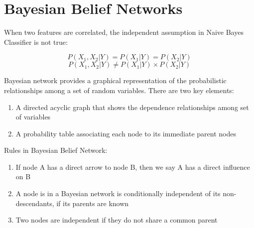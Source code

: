 \chapter{Bayesian Belief Networks}

\noindent When two features are correlated, the independent assumption in Naive Bayes Classifier is not true:

$$P(X_1 , X_2 | Y) = P(X_1 | Y) = P(X_2 | Y)$$
$$P(X_1 , X_2 | Y) \ne P(X_1 | Y) \times P(X_2 | Y)$$

\noindent Bayesian network provides a graphical representation of the probabilistic relationships among a set of random variables. There are two key elements:

\begin{enumerate}
    \item A directed acyclic graph that shows the dependence relationships among set of variables
    \item A probability table associating each node to its immediate parent nodes
\end{enumerate}

\noindent Rules in Bayesian Belief Network:

\begin{enumerate}
    \item If node A has a direct arrow to node B, then we say A has a direct influence on B
    \item A node is in a Bayesian network is conditionally independent of its non-descendants, if its parents are known
    \item Two nodes are independent if they do not share a common parent
\end{enumerate}